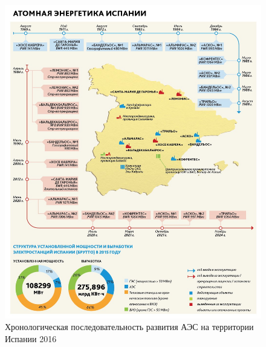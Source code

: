 \begin{figure}[h]
	\begin{center}
		\includegraphics[width=.5\columnwidth]{./img/spain_en_history.jpg}
	\end{center}
	\caption{Хронологическая последовательность развития АЭС на территории Испании 2016}
	\label{pic:spain_en_history}
\end{figure}